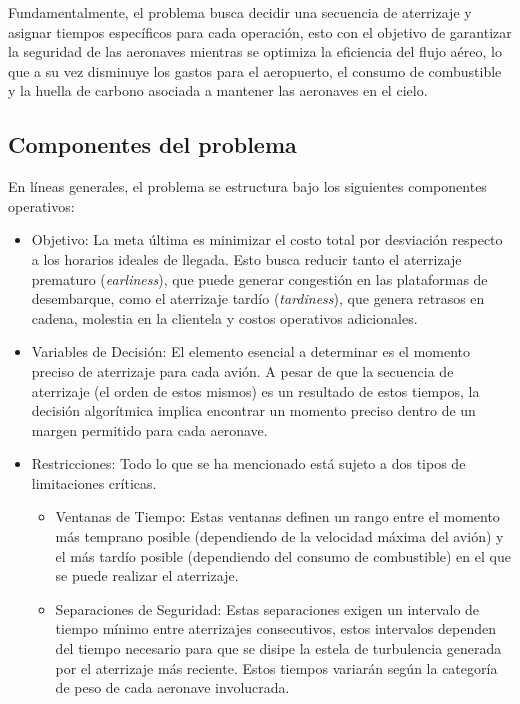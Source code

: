 \documentclass[letter, 10pt]{article}
\begin{document}
Fundamentalmente, el problema busca decidir una secuencia de aterrizaje y asignar tiempos espec\'ificos para cada operaci\'on, esto con el objetivo de garantizar la seguridad de las aeronaves mientras se optimiza la eficiencia del flujo a\'ereo\cite{beasley2000}, lo que a su vez disminuye los gastos para el aeropuerto, el consumo de combustible y la huella de carbono asociada a mantener las aeronaves en el cielo.

\subsection{Componentes del problema}
En l\'ineas generales, el problema se estructura bajo los siguientes componentes operativos:
\begin{itemize}
    \item Objetivo: La meta \'ultima es minimizar el costo total por desviaci\'on respecto a los horarios ideales de llegada. Esto busca reducir tanto el aterrizaje prematuro (\textit{earliness}), que puede generar congesti\'on en las plataformas de desembarque, como el aterrizaje tard\'io (\textit{tardiness}), que genera retrasos en cadena, molestia en la clientela y costos operativos adicionales. \cite{beasley2000}
    \item Variables de Decisi\'on: El elemento esencial a determinar es el momento preciso de aterrizaje para cada avi\'on. A pesar de que la secuencia de aterrizaje (el orden de estos mismos) es un resultado de estos tiempos, la decisi\'on algor\'itmica implica encontrar un momento preciso dentro de un margen permitido para cada aeronave.
    \item Restricciones: Todo lo que se ha mencionado est\'a sujeto a dos tipos de limitaciones cr\'iticas.
    \begin{itemize}
        \item Ventanas de Tiempo: Estas ventanas definen un rango entre el momento m\'as temprano posible (dependiendo de la velocidad m\'axima del avi\'on) y el m\'as tard\'io posible (dependiendo del consumo de combustible) en el que se puede realizar el aterrizaje.
        \item Separaciones de Seguridad: Estas separaciones exigen un intervalo de tiempo m\'inimo entre aterrizajes consecutivos, estos intervalos dependen del tiempo necesario para que se disipe la estela de turbulencia generada por el aterrizaje m\'as reciente. Estos tiempos variar\'an seg\'un la categor\'ia de peso de cada aeronave involucrada.
    \end{itemize}
\end{itemize}
\end{document}
